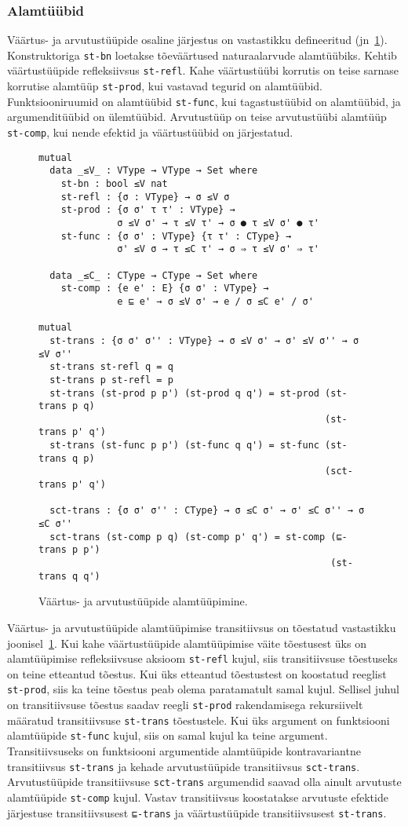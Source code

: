 \documentclass[a4paper,12pt]{article}
\begin{document}
\subsubsection{Alamtüübid}\label{ssec:exc.subtypes}
Väärtus- ja arvutustüüpide osaline järjestus on vastastikku defineeritud (jn~\ref{fig:exc.subtypes}).
Konstruktoriga {\tt st-bn} loetakse tõeväärtused naturaalarvude alamtüübiks.
Kehtib väärtustüüpide refleksiivsus {\tt st-refl}.
Kahe väärtustüübi korrutis on teise sarnase korrutise alamtüüp {\tt st-prod}, kui vastavad tegurid on alamtüübid.
Funktsiooniruumid on alamtüübid {\tt st-func}, kui tagastustüübid on alamtüübid,
ja argumenditüübid on ülemtüübid.
Arvutustüüp on teise arvutustüübi alamtüüp {\tt st-comp}, kui nende efektid ja väärtustüübid on järjestatud.
\begin{figure}
  \begin{BVerbatim}
mutual
  data _≤V_ : VType → VType → Set where
    st-bn : bool ≤V nat
    st-refl : {σ : VType} → σ ≤V σ
    st-prod : {σ σ' τ τ' : VType} →
              σ ≤V σ' → τ ≤V τ' → σ ● τ ≤V σ' ● τ'
    st-func : {σ σ' : VType} {τ τ' : CType} →
              σ' ≤V σ → τ ≤C τ' → σ ⇒ τ ≤V σ' ⇒ τ'

  data _≤C_ : CType → CType → Set where
    st-comp : {e e' : E} {σ σ' : VType} →
              e ⊑ e' → σ ≤V σ' → e / σ ≤C e' / σ'

mutual
  st-trans : {σ σ' σ'' : VType} → σ ≤V σ' → σ' ≤V σ'' → σ ≤V σ''
  st-trans st-refl q = q
  st-trans p st-refl = p
  st-trans (st-prod p p') (st-prod q q') = st-prod (st-trans p q)
                                                   (st-trans p' q')
  st-trans (st-func p p') (st-func q q') = st-func (st-trans q p)
                                                   (sct-trans p' q')

  sct-trans : {σ σ' σ'' : CType} → σ ≤C σ' → σ' ≤C σ'' → σ ≤C σ''
  sct-trans (st-comp p q) (st-comp p' q') = st-comp (⊑-trans p p')
                                                    (st-trans q q')
  \end{BVerbatim}
  \caption{Väärtus- ja arvutustüüpide alamtüüpimine.}
  \label{fig:exc.subtypes}
\end{figure}

Väärtus- ja arvutustüüpide alamtüüpimise transitiivsus on tõestatud vastastikku joonisel~\ref{fig:exc.subtypes}.
Kui kahe väärtustüüpide alamtüüpimise väite tõestusest üks on alamtüüpimise refleksiivsuse aksioom {\tt st-refl} kujul, siis transitiivsuse tõestuseks on teine etteantud tõestus.
Kui üks etteantud tõestustest on koostatud reeglist {\tt st-prod}, siis ka teine tõestus peab olema paratamatult samal kujul.
Sellisel juhul on transitiivsuse tõestus saadav reegli {\tt st-prod} rakendamisega rekursiivelt määratud transitiivsuse {\tt st-trans} tõestustele.
Kui üks argument on funktsiooni alamtüüpide {\tt st-func} kujul, siis on samal kujul ka teine argument. Transitiivsuseks on funktsiooni argumentide alamtüüpide kontravariantne transitiivsus {\tt st-trans} ja kehade arvutustüüpide transitiivsus {\tt sct-trans}.
Arvutustüüpide transitiivsuse {\tt sct-trans} argumendid saavad olla ainult arvutuste alamtüüpide {\tt st-comp} kujul. Vastav transitiivsus koostatakse arvutuste efektide järjestuse transitiivsusest {\tt ⊑-trans} ja väärtustüüpide transitiivsusest {\tt st-trans}.
\end{document}
